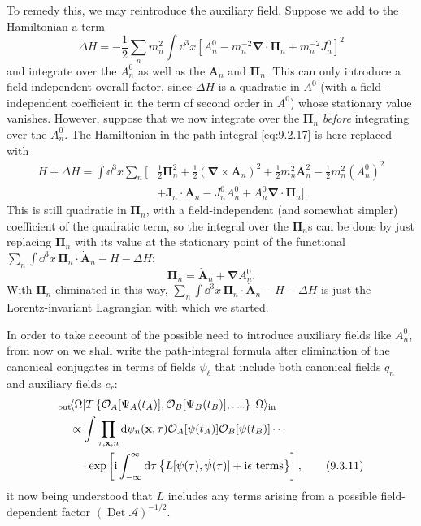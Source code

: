 To remedy this, we may reintroduce the auxiliary field. Suppose we add to the
Hamiltonian a term
\[
\Delta H=-\frac12\sum_n m_n^2\int \dd^3x
 \left[A_n^0-m_n^{-2}\boldsymbol\nabla\cdot\boldsymbol\Pi_n
 +m_n^{-2}J_n^0\right]^2
\]
and integrate over the $A_n^0$ as well as the $\mathbf A_n$ and
$\boldsymbol\Pi_n$. This can only introduce a field-independent overall
factor, since $\Delta H$ is a quadratic in $A^0$ (with a field-independent
coefficient in the term of second order in $A^0$) whose stationary value
vanishes. However, suppose that we now integrate over the $\boldsymbol\Pi_n$
\emph{before} integrating over the $A_n^0$. The Hamiltonian in the path
integral \eqref{eq:9.2.17} is here replaced with
\begin{align*}
H+\Delta H=\int \dd^3x\sum_n\biggl[&\frac12\boldsymbol\Pi_n^2
 +\frac12(\boldsymbol\nabla\times\mathbf A_n)^2
 +\frac12m_n^2\mathbf A_n^2-\frac12m_n^2(A_n^0)^2
\\
&+\mathbf J_n\cdot\mathbf A_n-J_n^0A_n^0
 +A_n^0\boldsymbol\nabla\cdot\boldsymbol\Pi_n\biggr].
\end{align*}
This is still quadratic in $\boldsymbol\Pi_n$, with a field-independent (and
somewhat simpler) coefficient of the quadratic term, so the integral over the
$\boldsymbol\Pi_n$s can be done by just replacing $\boldsymbol\Pi_n$ with its
value at the stationary point of the functional
$\sum_n\int \dd^3x\,\boldsymbol\Pi_n\cdot\dot{\mathbf A}_n-H-\Delta H$:
\[
\boldsymbol\Pi_n=\dot{\mathbf A}_n+\boldsymbol\nabla A_n^0.
\]
With $\boldsymbol\Pi_n$ eliminated in this way,
$\sum_n\int \dd^3x\,\boldsymbol\Pi_n\cdot\dot{\mathbf A}_n-H-\Delta H$ is just
the Lorentz-invariant Lagrangian with which we started.

In order to take account of the possible need to introduce auxiliary fields
like $A_n^0$, from now on we shall write the path-integral formula after
elimination of the canonical conjugates in terms of fields $\psi_\ell$ that
include both canonical fields $q_n$ and auxiliary fields $c_r$:
\begin{align}
&{}_{\mathrm{out}}\!\langle \Omega\rvert T\left\{
 \mathcal O_A[\Psi_A(t_A)],\mathcal O_B[\Psi_B(t_B)],\ldots\right\}
 \lvert \Omega\rangle_{\mathrm{in}}
\notag\\
&\quad\propto\int\prod_{\tau,\mathbf{x},n}\mathop{}\!\mathrm{d}\psi_n(\mathbf{x},\tau)
 \mathcal O_A[\psi(t_A)]\mathcal O_B[\psi(t_B)]\cdots
\notag\\
&\qquad\cdot\exp\left[\mathrm{i}\int_{-\infty}^{\infty}\mathop{}\!\mathrm{d}\tau
 \left\{L[\psi(\tau),\dot\psi(\tau)]+\mathrm{i}\epsilon\text{ terms}\right\}\right],
\tag{9.3.11}\label{eq:9.3.11}
\end{align}
it now being understood that $L$ includes any terms arising from a possible
field-dependent factor $(\operatorname{Det}\mathcal A)^{-1/2}$.
